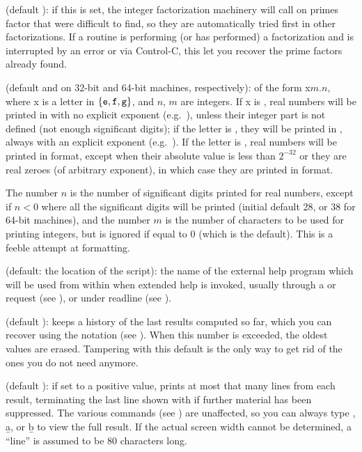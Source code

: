  (default ): if this is set, the integer
factorization machinery will call  on primes
factor that were difficult to find, so they are automatically tried first in
other factorizations. If a routine is performing (or has performed) a
factorization and is interrupted by an error or via Control-C, this let you
recover the prime factors already found.

 (default  and  on 32-bit and
64-bit machines, respectively): of the form x$m.n$, where x is a letter in
$\{{\tt e},{\tt f},{\tt g}\}$, and $n$, $m$ are integers. If x is ,
real numbers will be printed in  with no
explicit exponent (e.g.~), unless their integer part is not
defined (not enough significant digits); if the letter is , they
will be printed in , always with an explicit
exponent (e.g.~). If the letter is , real numbers will
be printed in  format, except when their absolute value is less than
$2^{-32}$ or they are real zeroes (of arbitrary exponent), in which case
they are printed in  format.\label{se:format}

The number $n$ is the number of significant digits printed for real
numbers, except if $n<0$ where all the significant digits will be printed
(initial default 28, or 38 for 64-bit machines), and the number $m$ is the
number of characters to be used for printing integers, but is ignored if
equal to 0 (which is the default). This is a feeble attempt at formatting.

 (default: the location of the  script): the
name of the external help program which will be used from within  when
extended help is invoked, usually through a  or  request
(see ), or  under readline (see
).

 (default ):  keeps a history of the last
 results computed so far, which you can recover using the
\kbd{\%} notation (see ). When this number is exceeded,
the oldest values are erased. Tampering with this default is the only way to
get rid of the ones you do not need anymore.

 (default ): if set to a positive value,  prints at
most that many lines from each result, terminating the last line shown with
\kbd{[+++]} if further material has been suppressed. The various 
commands (see ) are unaffected, so you can always type
, \b{a}, or \b{b} to view the full result. If the actual
screen width cannot be determined, a ``line'' is assumed to be 80 characters
long.

